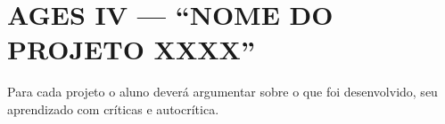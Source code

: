 \chapter[AGES IV --- “NOME DO PROJETO XXXX”]{AGES IV --- “NOME DO PROJETO XXXX”}

Para cada projeto o aluno deverá argumentar sobre o que foi desenvolvido,
seu aprendizado com críticas e autocrítica.




